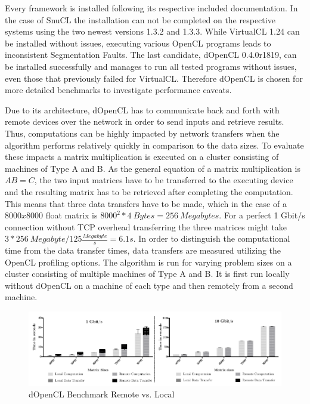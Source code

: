 Every framework is installed following its respective included documentation. In the case of SnuCL the installation can not be completed on the respective systems using the two newest versions 1.3.2 and 1.3.3. While VirtualCL 1.24 can be installed without issues, executing various OpenCL programs leads to inconsistent Segmentation Faults. The last candidate, dOpenCL 0.4.0r1819, can be installed successfully and manages to run all tested programs without issues, even those that previously failed for VirtualCL. Therefore dOpenCL is chosen for more detailed benchmarks to investigate performance caveats.

Due to its architecture, dOpenCL has to communicate back and forth with remote devices over the network in order to send inputs and retrieve results. Thus, computations can be highly impacted by network transfers when the algorithm performs relatively quickly in comparison to the data sizes. To evaluate these impacts a matrix multiplication is executed on a cluster consisting of machines of Type A and B. As the general equation of a matrix multiplication is $AB = C$, the two input matrices have to be transferred to the executing device and the resulting matrix has to be retrieved after completing the computation. This means that three data transfers have to be made, which in the case of a $8000x8000$ float matrix is $8000^2 * 4\ Bytes = 256\ Megabytes$. For a perfect 1 Gbit/s connection without TCP overhead transferring the three matrices might take $3*256\ Megabyte / 125\frac{Megabyte}{s} = 6.1s$. In order to distinguish the computational time from the data transfer times, data transfers are measured utilizing the OpenCL profiling options. The algorithm is run for varying problem sizes on a cluster consisting of multiple machines of Type A and B. It is first run locally without dOpenCL on a machine of each type and then remotely from a second machine.

\begin{figure}[!htb]

\includegraphics[width=1.0\textwidth]{images/data_transfer.pdf}
\centering
\caption{dOpenCL Benchmark Remote vs. Local}
\label{img:data_transfer}
\end{figure}

